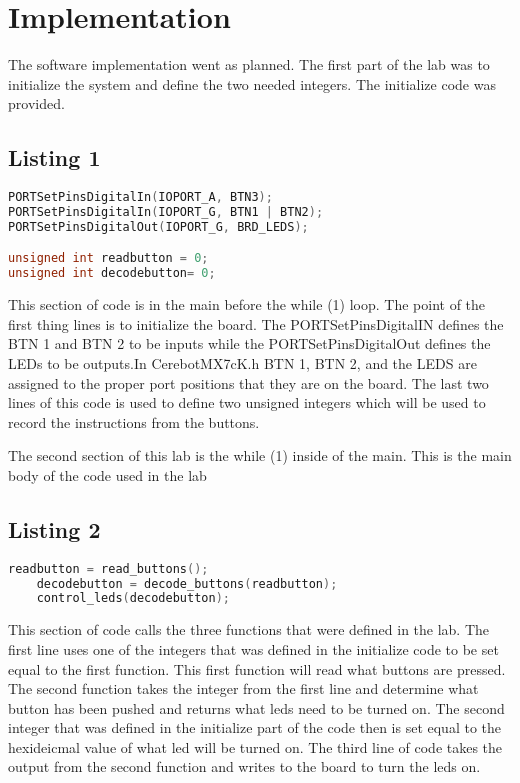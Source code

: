 \documentclass[11pt,a4]{report}
\begin{document}
\section{Implementation}
The software implementation went as planned. The first part of the lab was to initialize the system and define the two needed integers. The initialize code was provided. 

\subsection{Listing 1}
\begin{lstlisting}[language=C]
PORTSetPinsDigitalIn(IOPORT_A, BTN3);	
PORTSetPinsDigitalIn(IOPORT_G, BTN1 | BTN2); 
PORTSetPinsDigitalOut(IOPORT_G, BRD_LEDS); 	

unsigned int readbutton = 0;
unsigned int decodebutton= 0;
\end{lstlisting}
This section of code is in the main before the while (1) loop. The point of the first thing lines is to initialize the board. The PORTSetPinsDigitalIN defines the BTN 1 and BTN 2 to be inputs while the PORTSetPinsDigitalOut defines the LEDs to be outputs.In CerebotMX7cK.h BTN 1, BTN 2, and the LEDS are assigned to the proper port positions that they are on the board. The last two lines of this code is used to define two unsigned integers which will be used to record the instructions from the buttons. 

The second section of this lab is the while (1) inside of the main. This is the main body of the code used in the lab
\subsection{Listing 2}
\begin{lstlisting}[language=C]
    readbutton = read_buttons();
    decodebutton = decode_buttons(readbutton);
    control_leds(decodebutton);
\end{lstlisting}
This section of code calls the three functions that were defined in the lab. The first line uses one of the integers that was defined in the initialize code to be set equal to the first function. This first function will read what buttons are pressed. The second function takes the integer from the first line and determine what button has been pushed and returns what leds need to be turned on. The second integer that was defined in the initialize part of the code then is set equal to the hexideicmal value of what led will be turned on. The third line of code takes the output from the second function and writes to the board to turn the leds on.  
\end{document}

